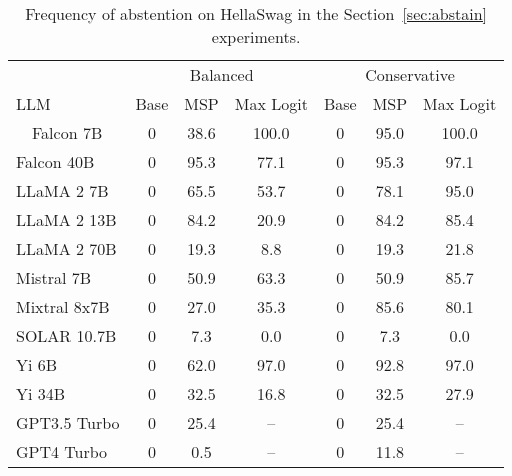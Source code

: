 \begin{table*}[h]
\centering
\caption{Frequency of abstention on HellaSwag in the Section~\ref{sec:abstain} experiments.}
\label{tab:hellaswag_pct_abstained}
\begin{tabular}{lcccccc}
\toprule
& \multicolumn{3}{c}{Balanced} & \multicolumn{3}{c}{Conservative} \\ 
LLM & Base & MSP & Max Logit & Base & MSP & Max Logit \\ 
\cmidrule(lr){1-1}\cmidrule(lr){2-4}\cmidrule(lr){5-7}\ \ 
Falcon 7B & 0 & 38.6 & 100.0 & 0 & 95.0 & 100.0\\
Falcon 40B & 0 & 95.3 & 77.1 & 0 & 95.3 & 97.1\\
LLaMA 2 7B & 0 & 65.5 & 53.7 & 0 & 78.1 & 95.0\\
LLaMA 2 13B & 0 & 84.2 & 20.9 & 0 & 84.2 & 85.4\\
LLaMA 2 70B & 0 & 19.3 & 8.8 & 0 & 19.3 & 21.8\\
Mistral 7B & 0 & 50.9 & 63.3 & 0 & 50.9 & 85.7\\
Mixtral 8x7B & 0 & 27.0 & 35.3 & 0 & 85.6 & 80.1\\
SOLAR 10.7B & 0 & 7.3 & 0.0 & 0 & 7.3 & 0.0\\
Yi 6B & 0 & 62.0 & 97.0 & 0 & 92.8 & 97.0\\
Yi 34B & 0 & 32.5 & 16.8 & 0 & 32.5 & 27.9\\
GPT3.5 Turbo & 0 & 25.4 & -- & 0 & 25.4 & --\\
GPT4 Turbo & 0 & 0.5 & -- & 0 & 11.8 & --\\
\bottomrule
\end{tabular}
\end{table*}
